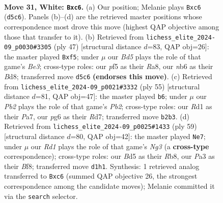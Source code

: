 \documentclass[11pt]{article}
\begin{document}
\clearpage

\begin{figure}[p]\centering
\begin{subfigure}{0.46\textwidth}\centering
\resizebox{\linewidth}{!}{%
\newchessgame
\chessboard[
  setfen={2b4r/r7/pnn1Pkp1/p2B1pNp/5B2/P4PP1/1P5P/RK1R4 w - - 3 31},
  showmover=false,
  pgfstyle=straightmove, color=movearrow, markmove={d5-c6}
]}
\caption{}
\end{subfigure}\hfill
\begin{subfigure}{0.46\textwidth}\centering
\resizebox{\linewidth}{!}{%
\newchessgame
\chessboard[
  setfen={r2b1rk1/1p4pp/p1p1bp2/2P1nN2/1P2P3/P1B3P1/6BP/R2R2K1 b - - 1 24},
  showmover=false,
  pgfstyle=straightmove, color=movearrow, markmove={e6-f5}
]}
\caption{}
\end{subfigure}
\\[4pt]
\begin{subfigure}{0.46\textwidth}\centering
\resizebox{\linewidth}{!}{%
\newchessgame
\chessboard[
  setfen={1k5r/pp1r4/5pn1/3pbNpp/3B4/4R1PP/PPP2P2/3R2K1 b - - 1 28},
  showmover=false,
  pgfstyle=straightmove, color=movearrow, markmove={b7-b6}
]}
\caption{}
\end{subfigure}\hfill
\begin{subfigure}{0.46\textwidth}\centering
\resizebox{\linewidth}{!}{%
\newchessgame
\chessboard[
  setfen={1rr2b1k/6pp/p4pn1/Rbp1p3/2B1N3/2PP1P2/1P4PP/2B2RK1 b - - 14 30},
  showmover=false,
  pgfstyle=straightmove, color=movearrow, markmove={g6-e7}
]}
\caption{}
\end{subfigure}
\caption{\textbf{Move 31, White: \texttt{Bxc6}.} (a) Our position; Melanie plays \texttt{Bxc6} (\texttt{d5c6}). Panels (b)--(d) are the retrieved master positions whose correspondence most drove this move (highest QAP objective among those that transfer to it). (b) Retrieved from \texttt{lichess\_elite\_2024-09\_p0030\#3305} (ply 47) [structural distance $d$=83, QAP obj=26]: the master played \texttt{Bxf5}; under $\mu$ our \emph{Bd5} plays the role of that game's \emph{Be3}; cross-type roles: our \emph{p}f5 as their \emph{R}a8, our \emph{n}b6 as their \emph{B}d8; transferred move \texttt{d5c6} \textbf{(endorses this move)}. (c) Retrieved from \texttt{lichess\_elite\_2024-09\_p0021\#3332} (ply 55) [structural distance $d$=81, QAP obj=47]: the master played \texttt{b6}; under $\mu$ our \emph{Pb2} plays the role of that game's \emph{Pb2}; cross-type roles: our \emph{R}d1 as their \emph{P}a7, our \emph{p}g6 as their \emph{R}d7; transferred move \texttt{b2b3}. (d) Retrieved from \texttt{lichess\_elite\_2024-09\_p0025\#1433} (ply 59) [structural distance $d$=80, QAP obj=42]: the master played \texttt{Ne7}; under $\mu$ our \emph{Rd1} plays the role of that game's \emph{Ng3} (a \textbf{cross-type} correspondence); cross-type roles: our \emph{B}d5 as their \emph{R}b8, our \emph{P}a3 as their \emph{B}f8; transferred move \texttt{d1h1}. Synthesis: 1 retrieved analog transferred to \texttt{Bxc6} (summed QAP objective 26, the strongest correspondence among the candidate moves); Melanie committed it via the \texttt{search} selector.}
\label{fig:thought-m60}
\end{figure}
\end{document}
